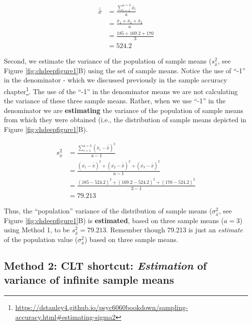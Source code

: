 \documentclass[
]{krantz}
\renewcommand{\href}[2]{#2\footnote{\url{#1}}}
\begin{document}
\[
\begin{aligned} 
\bar{\bar{x}} &= \frac{\sum_{i=1}^{a=3}{\bar{x}_i}}{a}\\
&= \frac{\bar{x}_1+\bar{x}_2+\bar{x}_3}{a}\\
&= \frac{185 + 169.2  + 170 }{3}\\
&= 524.2
\end{aligned} 
\]

Second, we estimate the variance of the population of sample means (\(s_{\bar{x}}^2\), see Figure \ref{fig:chdeepfigure1}B) using the set of sample means. Notice the use of ``-1'' in the denominator - \href{https://dstanley4.github.io/psyc6060bookdown/sampling-accuracy.html\#estimating-sigma2}{which we discussed previously in the sample accuracy chapter}. The use of the ``-1'' in the denominator means we are not calculating the variance of these three sample means. Rather, when we use ``-1'' in the denominator we are \textbf{estimating} the variance of the population of sample means from which they were obtained (i.e., the distribution of sample means depicted in Figure \ref{fig:chdeepfigure1}B).

\[
\begin{aligned} 
s_{\bar{x}}^2 &= \frac{\sum_{i=1}^{a=3}{(\bar{x}_i - \bar{\bar{x}})^2}}{a-1}\\
&= \frac{(\bar{x_1}- \bar{\bar{x}})^2+(\bar{x_2}- \bar{\bar{x}})^2+(\bar{x_3}- \bar{\bar{x}})^2}{a-1}\\
&= \frac{(185 - 524.2)^2+(169.2  - 524.2)^2+(170 - 524.2)^2}{3-1}\\
&= 79.213
\end{aligned} 
\]

Thus, the ``population'' variance of the distribution of sample means (\(\sigma_{\bar{x}}^2\), see Figure \ref{fig:chdeepfigure1}B) is \textbf{estimated}, based on three sample means (\(a = 3\)) using Method 1, to be \(s_{\bar{x}}^2 = 79.213\). Remember though 79.213 is just an \emph{estimate} of the population value (\(\sigma_{\bar{x}}^2\)) based on three sample means.

\hypertarget{method-2-clt-shortcut-estimation-of-variance-of-infinite-sample-means}{%
\subsection{\texorpdfstring{Method 2: CLT shortcut: \emph{Estimation} of variance of infinite sample means}{Method 2: CLT shortcut: Estimation of variance of infinite sample means}}\label{method-2-clt-shortcut-estimation-of-variance-of-infinite-sample-means}}
\end{document}
